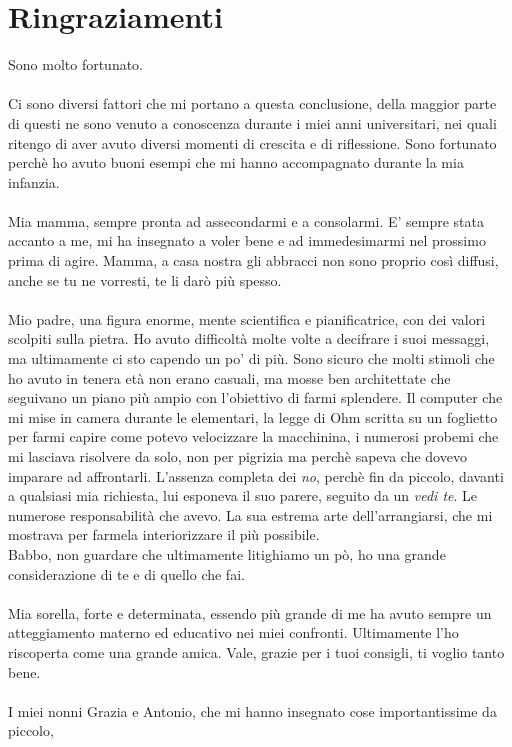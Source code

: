 \chapter{Ringraziamenti}\label{ch:ringraziamenti}
Sono molto fortunato.\\\\
 Ci sono diversi fattori che mi portano a questa conclusione, della maggior parte di questi
ne sono venuto a conoscenza durante i miei anni universitari, nei quali ritengo di aver avuto diversi momenti di crescita
e di riflessione.
Sono fortunato perchè ho avuto buoni esempi che mi hanno accompagnato durante la mia infanzia.
\\\\Mia mamma, sempre pronta ad assecondarmi e a consolarmi. E' sempre stata accanto a me, mi ha insegnato a voler bene e ad immedesimarmi nel prossimo prima di agire.
Mamma, a casa nostra gli abbracci non sono proprio così diffusi, anche se tu ne vorresti, te li darò più spesso.
\\\\Mio padre, una figura enorme, mente scientifica e pianificatrice, con dei valori scolpiti sulla pietra. Ho avuto difficoltà molte volte a decifrare i suoi messaggi,
ma ultimamente ci sto capendo un po' di più. Sono sicuro che molti stimoli che ho avuto in tenera età non erano casuali, ma mosse ben architettate
che seguivano un piano più ampio con l'obiettivo di farmi splendere. Il computer che mi mise in camera durante le elementari, la legge di Ohm scritta su un foglietto per farmi capire 
come potevo velocizzare la macchinina, i numerosi probemi che mi lasciava risolvere da solo, non per pigrizia ma perchè sapeva che dovevo imparare ad affrontarli.
 L'assenza completa dei \emph{no}, perchè fin da piccolo, davanti a qualsiasi mia richiesta, lui esponeva il suo parere, seguito da un \emph{vedi te}.
Le numerose responsabilità che avevo. La sua estrema arte dell'arrangiarsi, che mi mostrava per farmela interiorizzare il più possibile.
\\Babbo, non guardare che ultimamente litighiamo un pò, ho una grande considerazione di te e di quello che fai.
\\\\Mia sorella, forte e determinata, essendo più grande di me ha avuto sempre un atteggiamento materno ed educativo nei miei confronti. 
Ultimamente l'ho riscoperta come una grande amica.
Vale, grazie per i tuoi consigli, ti voglio tanto bene.
\\\\
I miei nonni Grazia e Antonio, che mi hanno insegnato cose importantissime da piccolo,
